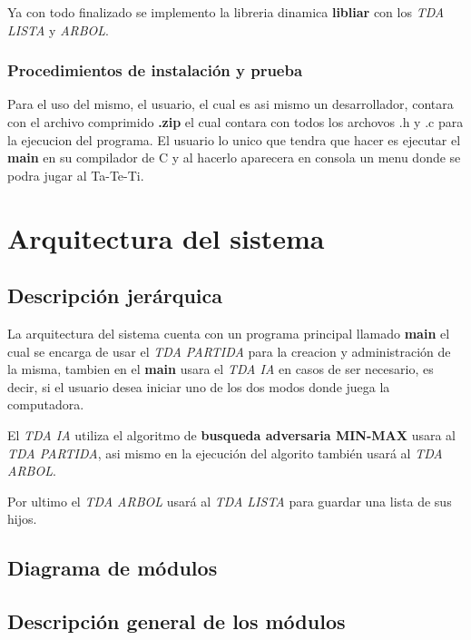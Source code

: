 \documentclass[12pt,twocolum,a4paper]{article}
\begin{document}
    Ya con todo finalizado se implemento la libreria dinamica {\bf libliar} con los {\itshape TDA LISTA} y {\itshape ARBOL}.

\subsubsection{Procedimientos de instalaci\'on y prueba}
    Para el uso del mismo, el usuario, el cual es asi mismo un desarrollador, contara con el archivo comprimido {\bf .zip} el cual contara con todos los archovos .h y .c para la ejecucion del programa. El usuario lo unico que tendra que hacer es ejecutar el {\bf main} en su compilador de C y al hacerlo aparecera en consola un menu donde se podra jugar al Ta-Te-Ti. 

\section{Arquitectura del sistema}

\subsection{Descripci\'on jer\'arquica}
    La arquitectura del sistema cuenta con un programa principal llamado {\bf main} el cual se encarga de usar el {\itshape TDA PARTIDA} para la creacion y administraci\'on de la misma, tambien en el {\bf main} usara el {\itshape TDA IA} en casos de ser necesario, es decir, si el usuario desea iniciar uno de los dos modos donde juega la computadora.

    El {\itshape TDA IA} utiliza el algoritmo de {\bf busqueda adversaria MIN-MAX} usara al {\itshape TDA PARTIDA}, asi mismo en la ejecuci\'on del algorito tambi\'en usar\'a al {\itshape TDA ARBOL}.

    Por ultimo el {\itshape TDA ARBOL} usar\'a al {\itshape TDA LISTA} para guardar una lista de sus hijos.

\subsection{Diagrama de m\'odulos}

\subsection{Descripci\'on general de los m\'odulos}
\end{document}
